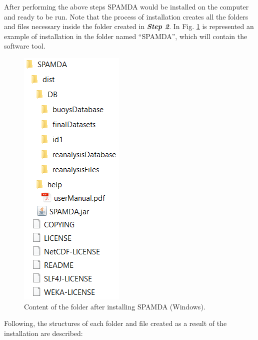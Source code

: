\begin{onehalfspace}
				After performing the above steps SPAMDA would be installed on the computer and ready to be run. Note that the process of installation creates all the folders and files necessary inside the folder created in \textit{\textbf{Step 2}}. In Fig. \ref{fig:installationOnWindows} is represented an example of installation in the folder named ``SPAMDA'', which will contain the software tool.
				
				\begin{figure}[ht!]
					\centering
					\includegraphics[scale=0.60]{figures/installationOnWindows.png}
					\caption{Content of the folder after installing SPAMDA (Windows).}
					\label{fig:installationOnWindows}
				\end{figure}
				
				Following, the structures of each folder and file created as a result of the installation are described:
				

\end{onehalfspace}
